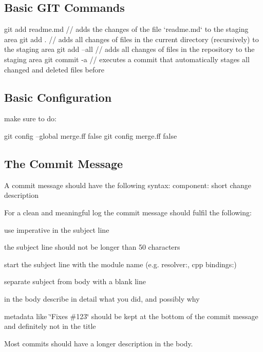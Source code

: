 \subsection*{Basic G\+IT Commands}

\begin{DoxyVerb}git add readme.md   // adds the changes of the file `readme.md` to the staging area
git add .           // adds all changes of files in the current directory (recursively) to the staging area
git add --all       // adds all changes of files in the repository to the staging area
git commit -a       // executes a commit that automatically stages all changed and deleted files before
\end{DoxyVerb}


\subsection*{Basic Configuration}

make sure to do\+: \begin{DoxyVerb}git config --global merge.ff false
git config merge.ff false
\end{DoxyVerb}


\subsection*{The Commit Message}

A commit message should have the following syntax\+: {\ttfamily component\+: short change description}

For a clean and meaningful log the commit message should fulfil the following\+:


\begin{DoxyItemize}
\item use imperative in the subject line
\item the subject line should not be longer than 50 characters
\item start the subject line with the module name (e.\+g. resolver\+:, cpp bindings\+:)
\item separate subject from body with a blank line
\item in the body describe in detail what you did, and possibly why
\item metadata like \char`\"{}\+Fixes \#123\char`\"{} should be kept at the bottom of the commit message and definitely not in the title
\end{DoxyItemize}

Most commits should have a longer description in the body.

